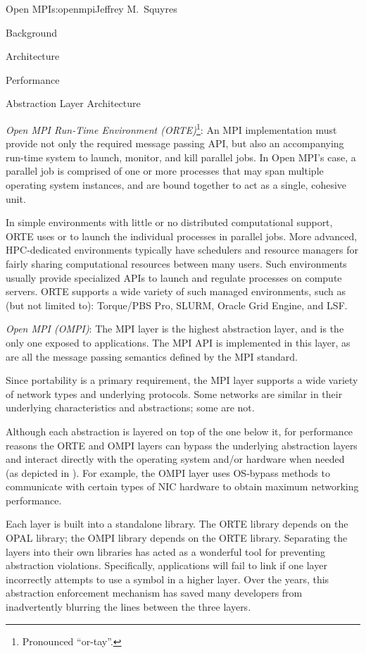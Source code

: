 \begin{aosachapter}{Open MPI}{s:openmpi}{Jeffrey M.\ Squyres}
\begin{aosasect1}{Background}
\begin{aosasect1}{Architecture}
\begin{aosasect2}{Performance}
\begin{aosasect2}{Abstraction Layer Architecture}
\begin{aosaitemize}
\item \emph{Open MPI Run-Time Environment (ORTE)}\footnote{Pronounced
    ``or-tay''.}: An MPI implementation must provide not only the
  required message passing API, but also an accompanying run-time
  system to launch, monitor, and kill parallel jobs.  In Open MPI's
  case, a parallel job is comprised of one or more processes that may
  span multiple operating system instances, and are bound together to
  act as a single, cohesive unit.

  In simple environments with little or no distributed computational
  support, ORTE uses  or  to launch the individual
  processes in parallel jobs.  More advanced, HPC-dedicated
  environments typically have schedulers and resource managers for
  fairly sharing computational resources between many users.  Such
  environments usually provide specialized APIs to launch and regulate
  processes on compute servers.  ORTE supports a wide variety of such
  managed environments, such as (but not limited to): Torque/PBS
  Pro, SLURM, Oracle Grid Engine, and LSF.

\item \emph{Open MPI (OMPI)}: The MPI layer is the highest abstraction layer,
  and is the only one exposed to applications.  The MPI API is
  implemented in this layer, as are all the message passing semantics
  defined by the MPI standard.

  Since portability is a primary requirement, the MPI layer supports a
  wide variety of network types and underlying protocols.  Some
  networks are similar in their underlying characteristics and
  abstractions; some are not.
\end{aosaitemize}

Although each abstraction is layered on top of the one below it, for
performance reasons the ORTE and OMPI layers can bypass the
underlying abstraction layers and interact directly with the operating
system and/or hardware when needed (as depicted in
).  For example, the OMPI layer uses
OS-bypass methods to communicate with certain types of NIC hardware to
obtain maximum networking performance.

Each layer is built into a standalone library.  The ORTE library
depends on the OPAL library; the OMPI library depends on the ORTE
library.
%
Separating the layers into their own libraries has acted as a
wonderful tool for preventing abstraction violations.
%
Specifically, applications will fail to link if one layer incorrectly
attempts to use a symbol in a higher layer.
%
Over the years, this abstraction enforcement mechanism has saved many
developers from inadvertently blurring the lines between the three
layers.


\end{aosasect2}
\end{aosasect2}
\end{aosasect1}
\end{aosasect1}
\end{aosachapter}
